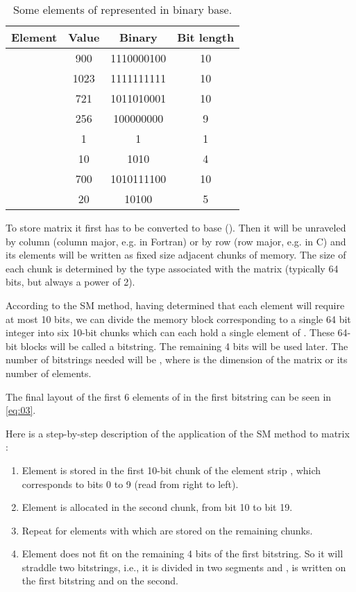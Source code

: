 \documentclass[10pt]{article}
\begin{document}
\begin{table}[h]
 \centering
 \caption{Some elements of  represented in binary base.}
 \begin{tabular}{cccc} 
  \hline 
  Element & Value  & Binary & Bit length\\
  \hline
   & 900  & 1110000100 & 10\\
   & 1023 & 1111111111 & 10\\
   & 721  & 1011010001 & 10\\
   & 256  & 100000000  & 9\\
   & 1    & 1          & 1\\
   & 10   & 1010       & 4\\
   & 700  & 1010111100 & 10\\
   & 20   & 10100      & 5\\
  \hline
 \end{tabular}
 \label{tab:01}
\end{table}

To store matrix  it first has to be converted to base  (). Then it will be unraveled by column (column major, e.g. in Fortran) or by row (row major, e.g. in C) and its elements will be written as  fixed size adjacent chunks of memory. The size of each chunk is determined by the type associated with the matrix (typically 64 bits, but always a power of 2).

According to the SM method, having determined that each element will require at most 10 bits, we can divide the memory block corresponding to a single 64 bit integer into six 10-bit chunks which can each hold a single element of . These 64-bit blocks will be called a bitstring. The remaining 4 bits will be used later. The number of bitstrings needed will be , where  is the dimension of the matrix or its number of elements.

The final layout of the first 6 elements of  in the first bitstring can be seen in \ref{eq:03}.



Here is a step-by-step description of the application of the SM method to matrix :

\begin{enumerate}
 \item Element  is stored in the first 10-bit chunk of the element strip  , which corresponds to bits 0 to 9 (read from right to left).

 \item Element  is allocated in the second chunk, from bit 10 to bit 19.

 \item Repeat for elements  with  which are stored on the remaining chunks.
 
 \item Element  does not fit on the remaining 4 bits of the first bitstring. So it will straddle two bitstrings, i.e., it is divided in two segments  and ,  is written on the first bitstring and  on the second.
 
\end{enumerate}
\end{document}
